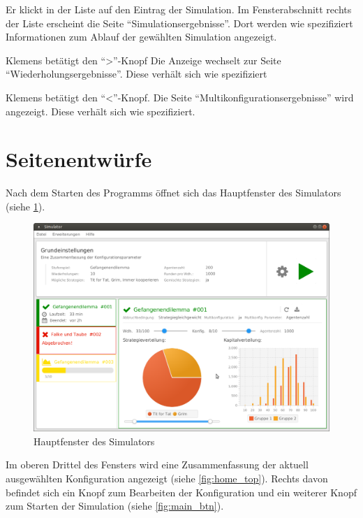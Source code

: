 \documentclass[parskip=full,11pt]{scrartcl}
\begin{document}
{Er klickt in der Liste auf den Eintrag der Simulation.}
{Im Fensterabschnitt rechts der Liste erscheint die Seite \enquote{Simulationsergebnisse}. Dort werden wie spezifiziert Informationen zum Ablauf der gewählten Simulation angezeigt.}

{Klemens betätigt den \enquote{>}-Knopf}
{Die Anzeige wechselt zur Seite \enquote{Wiederholungsergebnisse}. Diese verhält sich wie spezifiziert}

{Klemens betätigt den \enquote{<}-Knopf.}
{Die Seite \enquote{Multikonfigurationsergebnisse} wird angezeigt. Diese verhält sich wie spezifiziert.}


\appendix
\newpage
\section{Seitenentwürfe}

Nach dem Starten des Programms öffnet sich das Hauptfenster des Simulators \\(siehe \cref{fig:home}).

\begin{figure}[hb]
	\includegraphics[width=\textwidth]{images/home.png}
	\caption{\label{fig:home}
		Hauptfenster des Simulators}
\end{figure}

Im oberen Drittel des Fensters wird eine Zusammenfassung der aktuell ausgewählten Konfiguration angezeigt (siehe \cref{fig:home_top}). Rechts davon befindet sich ein Knopf zum Bearbeiten der Konfiguration und ein weiterer Knopf zum Starten der Simulation (siehe \cref{fig:main_btn}).
 
\end{document}
